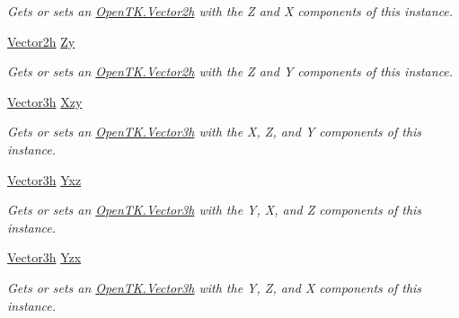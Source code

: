 \begin{DoxyCompactItemize}
\begin{DoxyCompactList}\small\item\em Gets or sets an \hyperlink{struct_open_t_k_1_1_vector2h}{Open\-T\-K.\-Vector2h} with the Z and X components of this instance. \end{DoxyCompactList}\item 
\hyperlink{struct_open_t_k_1_1_vector2h}{Vector2h} \hyperlink{struct_open_t_k_1_1_vector3h_a8b56a3387db80c5ef53ab06ebee62b55}{Zy}
\begin{DoxyCompactList}\small\item\em Gets or sets an \hyperlink{struct_open_t_k_1_1_vector2h}{Open\-T\-K.\-Vector2h} with the Z and Y components of this instance. \end{DoxyCompactList}\item 
\hyperlink{struct_open_t_k_1_1_vector3h}{Vector3h} \hyperlink{struct_open_t_k_1_1_vector3h_a2d741bbec8beb698f01ae815801937ee}{Xzy}
\begin{DoxyCompactList}\small\item\em Gets or sets an \hyperlink{struct_open_t_k_1_1_vector3h}{Open\-T\-K.\-Vector3h} with the X, Z, and Y components of this instance. \end{DoxyCompactList}\item 
\hyperlink{struct_open_t_k_1_1_vector3h}{Vector3h} \hyperlink{struct_open_t_k_1_1_vector3h_a1153d34161e8b1b76e1daedef27b8691}{Yxz}
\begin{DoxyCompactList}\small\item\em Gets or sets an \hyperlink{struct_open_t_k_1_1_vector3h}{Open\-T\-K.\-Vector3h} with the Y, X, and Z components of this instance. \end{DoxyCompactList}\item 
\hyperlink{struct_open_t_k_1_1_vector3h}{Vector3h} \hyperlink{struct_open_t_k_1_1_vector3h_a31eaef98f6b957b90756a3b51df9e14d}{Yzx}
\begin{DoxyCompactList}\small\item\em Gets or sets an \hyperlink{struct_open_t_k_1_1_vector3h}{Open\-T\-K.\-Vector3h} with the Y, Z, and X components of this instance. \end{DoxyCompactList}\item 

\end{DoxyCompactItemize}
